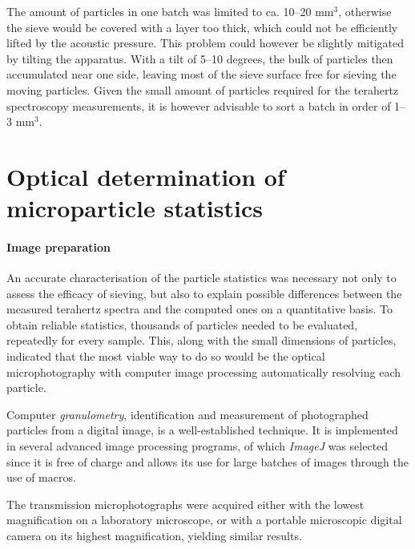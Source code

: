 The amount of particles in one batch was limited to ca. 10--20 mm$^{3}$, otherwise the sieve would be covered with a layer too thick, which could not be efficiently lifted by the acoustic pressure.
This problem could however be slightly mitigated by tilting the apparatus. With a tilt of 5--10 degrees, the bulk of particles then accumulated near one side, leaving most of the sieve surface free for sieving the moving particles. Given the small amount of particles required for the terahertz spectroscopy measurements, it is however advisable to sort a batch in order of 1--3 mm$^{3}$.

\section{Optical determination of microparticle statistics}
\paragraph{Image preparation} %
An accurate characterisation of the particle statistics was necessary not only to assess the efficacy of sieving, but also to explain  possible differences between the measured terahertz spectra and the computed ones  on a quantitative basis. To obtain reliable statistics, thousands of particles needed to be evaluated, repeatedly for every sample. This, along with the small dimensions of particles, indicated that the most viable way to do so would be the optical microphotography with computer image processing automatically resolving each particle.

Computer \textit{granulometry}, identification and measurement of photographed particles from a digital image,
is a well-established technique. It is implemented in several advanced image processing programs, of which \textit{ImageJ} was selected \cite{abramoff2004image} since it is free of charge and allows its use for large batches of images through the use of macros. 

The transmission microphotographs were acquired either with the lowest magnification on a laboratory microscope, or with a portable microscopic digital camera on its highest magnification, yielding similar results.

